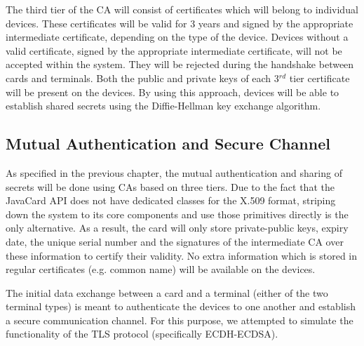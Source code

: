 \documentclass[a4paper,10pt]{llncs}
\begin{document}
The third tier of the CA will consist of certificates which will belong to individual devices. These certificates will be valid for 3 years and signed by the appropriate intermediate certificate, depending on the type of the device. Devices without a valid certificate, signed by the appropriate intermediate certificate, will not be accepted within the system. They will be rejected during the handshake between cards and terminals. Both the public and private keys of each 3$^{rd}$ tier certificate will be present on the devices. By using this approach, devices will be able to establish shared secrets using the Diffie-Hellman key exchange algorithm.

\subsection{Mutual Authentication and Secure Channel}
\label{section:mutualauth}
As specified in the previous chapter, the mutual authentication and sharing of secrets will be done using CAs based on three tiers. Due to the fact that the JavaCard API does not have dedicated classes for the X.509 format, striping down the system to its core components and use those primitives directly is the only alternative. As a result, the card will only store private-public keys, expiry date, the unique serial number and the signatures of the intermediate CA over these information to certify their validity. No extra information which is stored in regular certificates (e.g. common name) will be available on the devices.

The initial data exchange between a card and a terminal (either of the two terminal types) is meant to authenticate the devices to one another and establish a secure communication channel. For this purpose, we attempted to simulate the functionality of the TLS protocol (specifically ECDH-ECDSA).
\end{document}
